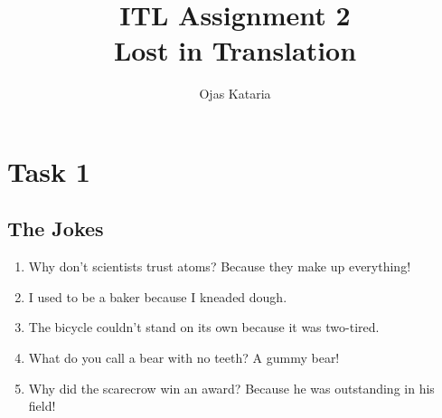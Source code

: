 \documentclass{article}
\title{ITL Assignment 2\\Lost in Translation}
\author{Ojas Kataria}
\date{}
\begin{document}
\maketitle

\section{Task 1}

\subsection{The Jokes}
\begin{enumerate}
    \item Why don’t scientists trust atoms? Because they make up everything!
    \item I used to be a baker because I kneaded dough.
    \item The bicycle couldn't stand on its own because it was two-tired.
    \item What do you call a bear with no teeth? A gummy bear!
    \item Why did the scarecrow win an award? Because he was outstanding in his field!
\end{enumerate}
\end{document}
